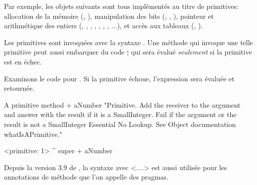 \documentclass[a4paper,10pt,twoside]{book}
\begin{document}
Par exemple, les objets suivants sont tous impl\'{e}ment\'{e}s au titre de primitives:
allocation de la m\'{e}moire (, ),
manipulation des bits (, , ),
pointeur et arithm\'{e}tique des entiers (\ct{+}, \ct{-},  \ct{<},  \ct{>}, \ct{*}, \ct{/ }, \ct{=}, \ct{==}...),
et acc\`{e}s aux tableaux (, ).

Les primitives sont invoqu\'{e}es avec la syntaxe  .
Une m\'{e}thode qui invoque une telle primitive peut aussi embarquer du code \st, qui sera \'{e}valu\'{e}  \emph{seulement} si la primitive est en \'{e}chec.

Examinons le code pour .
Si la primitive \'{e}choue, l'expression  sera \'{e}valu\'{e}e et retourn\'{e}e.

\begin{method}[primitive]{A primitive method}
+ aNumber 
  "Primitive. Add the receiver to the argument and answer with the result
  if it is a SmallInteger. Fail if the argument or the result is not a
  SmallInteger  Essential  No Lookup. See Object documentation whatIsAPrimitive."

  <primitive: 1>
  ^ super + aNumber
\end{method}





Depuis la version 3.9 de \sq, la syntaxe avec <....> est aussi utilis\'{e}e pour les annotations de m\'{e}thode que l'on appelle des pragmas.
\end{document}
